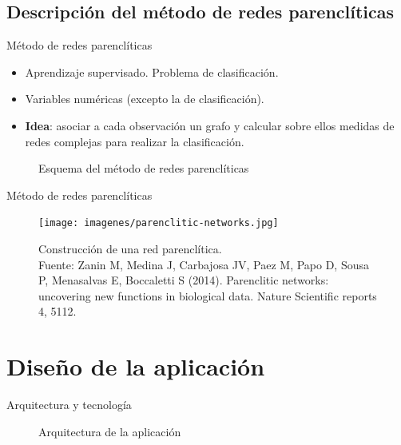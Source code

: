 \documentclass[hyperref={unicode}]{beamer}
\begin{document}
\subsection{Descripción del método de redes parenclíticas}
\begin{frame}{Método de redes parenclíticas}
	\begin{itemize}
	\item Aprendizaje supervisado. Problema de clasificación.
	\item Variables numéricas (excepto la de clasificación).
	\item \textbf{Idea}: asociar a cada observación un grafo y calcular sobre ellos medidas de redes complejas para realizar la clasificación. 
	\end{itemize}
	
	\begin{figure}[htbp!]
		\begin{center}
			\resizebox{\textwidth}{!}{%
				\redesparencliticas
			}
		\end{center}
		\caption{Esquema del método de redes parenclíticas}
		\label{fig:redesparencliticas}
	\end{figure}
\end{frame}


\begin{frame}{Método de redes parenclíticas}
	\begin{figure}[htbp!]
		\centering
		\texttt{[image: imagenes/parenclitic-networks.jpg]}
		\label{fig:parencliticas}
		\caption{Construcción de una red parenclítica. \\
		Fuente: Zanin M, Medina J, Carbajosa JV, Paez M, Papo D, Sousa P, Menasalvas E, Boccaletti S (2014). Parenclitic networks: uncovering new functions in biological data. Nature Scientific reports 4, 5112.}
	\end{figure} 
\end{frame}


\section{Diseño de la aplicación}
\begin{frame}{Arquitectura y tecnología}
	\begin{figure}[htbp!]
		\centering
		\arquitectura
		\caption{Arquitectura de la aplicación}
		\label{fig:arquitectura}
	\end{figure}
\end{frame}
\end{document}
